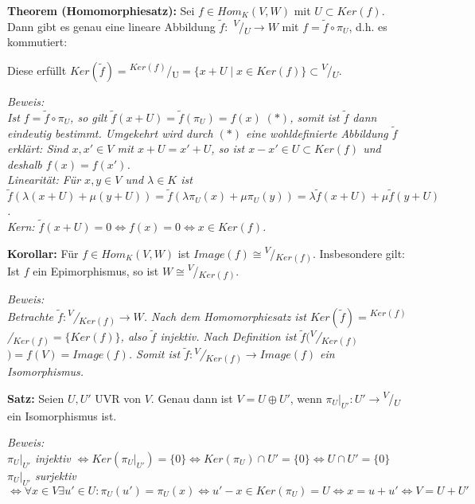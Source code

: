 \documentclass[11pt]{article}
\newcommand{\qraum}[2]{\textsuperscript{#1}/\textsubscript{#2}}
\begin{document}
		\begin{mdframed}[backgroundcolor=blue!20]
			\textbf{Theorem (Homomorphiesatz):} Sei $f\in Hom_K(V,W)$ mit $U\subset Ker(f)$. Dann gibt es genau eine lineare Abbildung $\tilde f:$
			\qraum{$V$}{$U$}$\to W$ mit $f=\tilde f \circ \pi_U$, d.h. es kommutiert: \\
			\begin{center}
			\end{center}
			Diese erfüllt $Ker(\tilde f)=$\qraum{$Ker(f)$}{U}$=\{x+U\mid x\in Ker(f)\}\subset$\qraum{$V$}{$U$}.
		\end{mdframed}
		\textit{Beweis: \\
		Ist $f=\tilde f\circ \pi_U$, so gilt $\tilde f(x+U)=\tilde f(\pi_U)=f(x)\; (*)$, somit ist $\tilde f$ dann eindeutig bestimmt. Umgekehrt 
		wird durch $(*)$ eine wohldefinierte Abbildung $\tilde f$ erklärt: Sind $x,x'\in V$ mit $x+U=x'+U$, so ist $x-x'\in U\subset Ker(f)$ und 
		deshalb $f(x)=f(x')$. \\
		Linearität: Für $x,y\in V$ und $\lambda\in K$ ist $\tilde f(\lambda(x+U)+\mu(y+U))=\tilde f(\lambda\pi_U(x)+\mu\pi_U(y))=\lambda\tilde f
		(x+U)+\mu\tilde f(y+U)$. \\
		Kern: $\tilde f(x+U)=0\iff f(x)=0 \iff x\in Ker(f)$.}
		
		\begin{framed}
			\textbf{Korollar:} Für $f\in Hom_K(V,W)$ ist $Image(f)\cong $\qraum{$V$}{$Ker(f)$}. Insbesondere gilt: Ist $f$ ein Epimorphismus, so 
			ist $W\cong $\qraum{$V$}{$Ker(f)$}.
		\end{framed}
		\textit{Beweis: \\
		Betrachte $\tilde f:$\qraum{$V$}{$Ker(f)$}$\to W$. Nach dem Homomorphiesatz ist $Ker(\tilde f)=$\qraum{$Ker(f)$}{$Ker(f)$}$=\{Ker(f)\}$, 
		also $\tilde f$ injektiv. Nach Definition ist $\tilde f($\qraum{$V$}{$Ker(f)$}$)=f(V)=Image(f)$. Somit ist $\tilde f:$\qraum{$V$}
		{$Ker(f)$}$\to Image(f)$ ein Isomorphismus.}
		
		\begin{framed}
			\textbf{Satz:} Seien $U,U'$ UVR von $V$. Genau dann ist $V=U\oplus U'$, wenn $\pi_U|_{U'}: U'\to$\qraum{$V$}{$U$} ein Isomorphismus 
			ist.
		\end{framed}
		\textit{Beweis: \\
		$\pi_U|_{U'}$ injektiv $\iff Ker(\pi_U|_{U'})=\{0\}\iff Ker(\pi_U)\cap U'=\{0\}\iff U\cap U'=\{0\}$ \\
		$\pi_U|_{U'}$ surjektiv $\iff \forall x\in V \exists u'\in U: \pi_U(u')=\pi_U(x)\iff u'-x\in Ker(\pi_U)=U\iff x=u+u'\iff V=U+U'$}
		
\end{document}
